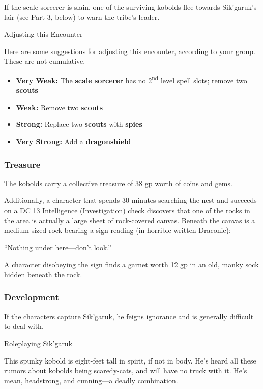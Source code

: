 If the scale sorcerer is slain, one of the surviving kobolds flee
towards Sik'garuk's lair (see Part 3, below) to warn the tribe's leader.

Adjusting this Encounter

Here are some suggestions for adjusting this encounter, according to
your group. These are not cumulative.

\begin{itemize}
\item
  \textbf{Very Weak:} The \textbf{scale sorcerer} has no
  2\textsuperscript{nd} level spell slots; remove two \textbf{scouts}
\item
  \textbf{Weak:} Remove two \textbf{scouts}
\item
  \textbf{Strong:} Replace two \textbf{scouts} with \textbf{spies}
\item
  \textbf{Very Strong:} Add a \textbf{dragonshield}
\end{itemize}

\subsubsection{Treasure}\label{treasure}

The kobolds carry a collective treasure of 38 gp worth of coins and
gems.

Additionally, a character that spends 30 minutes searching the nest and
succeeds on a DC 13 Intelligence (Investigation) check discovers that
one of the rocks in the area is actually a large sheet of rock-covered
canvas. Beneath the canvas is a medium-sized rock bearing a sign reading
(in horrible-written Draconic):

``Nothing under here---don't look.''

A character disobeying the sign finds a garnet worth 12 gp in an old,
manky sock hidden beneath the rock.

\subsubsection{Development}\label{development}

If the characters capture Sik'garuk, he feigns ignorance and is
generally difficult to deal with.

Roleplaying Sik'garuk

This spunky kobold is eight-feet tall in spirit, if not in body. He's
heard all these rumors about kobolds being scaredy-cats, and will have
no truck with it. He's mean, headstrong, and cunning---a deadly
combination.

